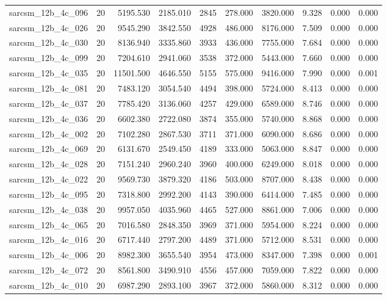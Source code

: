 \begin{tabular}{lrrrrrrrrr}
sarcsm\_12b\_4c\_096 & 20 & 5195.530 & 2185.010 & 2845 & 278.000 & 3820.000 & 9.328 & 0.000 & 0.000 \\
sarcsm\_12b\_4c\_026 & 20 & 9545.290 & 3842.550 & 4928 & 486.000 & 8176.000 & 7.509 & 0.000 & 0.000 \\
sarcsm\_12b\_4c\_030 & 20 & 8136.940 & 3335.860 & 3933 & 436.000 & 7755.000 & 7.684 & 0.000 & 0.000 \\
sarcsm\_12b\_4c\_099 & 20 & 7204.610 & 2941.060 & 3538 & 372.000 & 5443.000 & 7.660 & 0.000 & 0.000 \\
sarcsm\_12b\_4c\_035 & 20 & 11501.500 & 4646.550 & 5155 & 575.000 & 9416.000 & 7.990 & 0.000 & 0.001 \\
sarcsm\_12b\_4c\_081 & 20 & 7483.120 & 3054.540 & 4494 & 398.000 & 5724.000 & 8.413 & 0.000 & 0.000 \\
sarcsm\_12b\_4c\_037 & 20 & 7785.420 & 3136.060 & 4257 & 429.000 & 6589.000 & 8.746 & 0.000 & 0.000 \\
sarcsm\_12b\_4c\_036 & 20 & 6602.380 & 2722.080 & 3874 & 355.000 & 5740.000 & 8.868 & 0.000 & 0.000 \\
sarcsm\_12b\_4c\_002 & 20 & 7102.280 & 2867.530 & 3711 & 371.000 & 6090.000 & 8.686 & 0.000 & 0.000 \\
sarcsm\_12b\_4c\_069 & 20 & 6131.670 & 2549.450 & 4189 & 333.000 & 5063.000 & 8.847 & 0.000 & 0.000 \\
sarcsm\_12b\_4c\_028 & 20 & 7151.240 & 2960.240 & 3960 & 400.000 & 6249.000 & 8.018 & 0.000 & 0.000 \\
sarcsm\_12b\_4c\_022 & 20 & 9569.730 & 3879.320 & 4186 & 503.000 & 8707.000 & 8.438 & 0.000 & 0.000 \\
sarcsm\_12b\_4c\_095 & 20 & 7318.800 & 2992.200 & 4143 & 390.000 & 6414.000 & 7.485 & 0.000 & 0.000 \\
sarcsm\_12b\_4c\_038 & 20 & 9957.050 & 4035.960 & 4465 & 527.000 & 8861.000 & 7.006 & 0.000 & 0.000 \\
sarcsm\_12b\_4c\_065 & 20 & 7016.580 & 2848.350 & 3969 & 371.000 & 5954.000 & 8.224 & 0.000 & 0.000 \\
sarcsm\_12b\_4c\_016 & 20 & 6717.440 & 2797.200 & 4489 & 371.000 & 5712.000 & 8.531 & 0.000 & 0.000 \\
sarcsm\_12b\_4c\_006 & 20 & 8982.300 & 3655.540 & 3954 & 473.000 & 8347.000 & 7.398 & 0.000 & 0.001 \\
sarcsm\_12b\_4c\_072 & 20 & 8561.800 & 3490.910 & 4556 & 457.000 & 7059.000 & 7.822 & 0.000 & 0.000 \\
sarcsm\_12b\_4c\_010 & 20 & 6987.290 & 2893.100 & 3967 & 372.000 & 5860.000 & 8.312 & 0.000 & 0.000 \\

\end{tabular}
